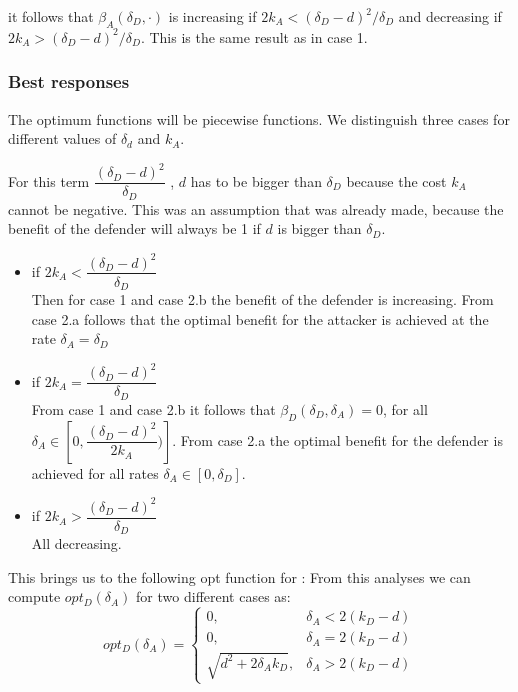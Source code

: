 it follows that $\beta_{A}(\delta_{D},\cdot)$ is increasing if $2k_{A} < (\delta_{D} - d)^{2} / \delta_{D}$ and decreasing if $2k_{A} > (\delta_{D} - d)^{2} / \delta_{D}$. This is the same result as in case 1.\\


\subsubsection{Best responses}
The optimum functions will be piecewise functions. We distinguish three cases for different values of $\delta_{d}$ and $k_{A}$. 


For this term $\dfrac{(\delta_{D}-d)^{2}}{\delta_{D}} $ , $d$ has to be bigger than  $\delta_{D}$ because the cost $k_{A}$ cannot be negative. This was an assumption that was already made, because the benefit of the defender will always be 1 if $d$ is bigger than  $\delta_{D}$.
\begin{itemize}
\item if $2k_{A} < \dfrac{(\delta_{D}-d)^{2}}{\delta_{D}} $ \\
Then for case 1 and case 2.b the benefit of the defender is increasing. From case 2.a follows that the optimal benefit for the attacker is achieved at the rate $\delta_{A} = \delta_{D}$
\item if $2k_{A} = \dfrac{(\delta_{D}-d)^{2}}{\delta_{D}} $ \\
From case 1 and case 2.b it follows that $\beta_{D}(\delta_{D},\delta_{A})=0$, for all $\delta_{A} \in [0,\dfrac{(\delta_{D}-d)^{2}}{2k_{A}})]$. From case 2.a the optimal benefit for the defender is achieved for all rates $\delta_{A} \in [0, \delta_{D}]$.
\item if $2k_{A} > \dfrac{(\delta_{D}-d)^{2}}{\delta_{D}} $ \\
All decreasing.
\end{itemize}

This brings us to the following opt function for :
From this analyses we can compute $opt_{D}(\delta_{A})$ for two different cases as:
 \begin{displaymath}
  opt_{D}(\delta_{A}) = \left\{
     \begin{array}{lr}
       0, & \delta_{A} < 2(k_{D} - d)\\
       0, & \delta_{A} = 2(k_{D} - d) \\
       \sqrt{d^{2} + 2\delta_{A}k_{D}}, & \delta_{A} > 2(k_{D} - d)
     \end{array}
   \right.
\end{displaymath}